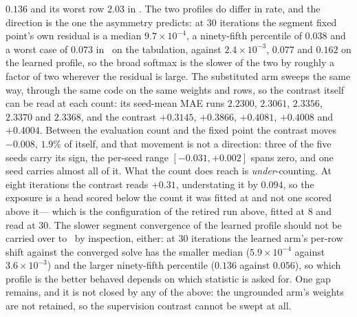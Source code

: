 $0.136$ and its worst row $2.03$ in \lnx. The two profiles do differ in rate, and the direction is
the one the asymmetry predicts: at $30$ iterations the segment fixed point's own residual is a
median $9.7\times10^{-4}$, a ninety-fifth percentile of $0.038$ and a worst case of $0.073$ in \lngi\
on the tabulation, against $2.4\times10^{-3}$, $0.077$ and $0.162$ on the learned profile, so the
broad softmax is the slower of the two by roughly a factor of two wherever the residual is large.
The substituted arm sweeps the same way, through the same code on the same weights and rows, so the
contrast itself can be read at each count: its seed-mean MAE runs $2.2300$, $2.3061$, $2.3356$,
$2.3370$ and $2.3368$, and the contrast $+0.3145$, $+0.3866$, $+0.4081$, $+0.4008$ and $+0.4004$.
Between the evaluation count and the fixed point the contrast moves $-0.008$, $1.9\%$ of itself, and
that movement is not a direction: three of the five seeds carry its sign, the per-seed range
$[-0.031,+0.002]$ spans zero, and one seed carries almost all of it. What the count does reach is
\emph{under}-counting. At eight iterations the contrast reads $+0.31$, understating it by $0.094$,
so the exposure is a head scored below the count it was fitted at and not one scored above it---
which is the configuration of the retired run above, fitted at $8$ and read at $30$. The slower
segment convergence of the learned profile should not be carried over to \lnx\ by inspection,
either: at $30$ iterations the learned arm's per-row shift against the converged solve has the
smaller median ($5.9\times10^{-4}$ against $3.6\times10^{-3}$) and the larger ninety-fifth
percentile ($0.136$ against $0.056$), so which profile is the better behaved depends on which
statistic is asked for. One gap remains, and it is not closed by any of the above: the ungrounded
arm's weights are not retained, so the supervision contrast cannot be swept at all.

